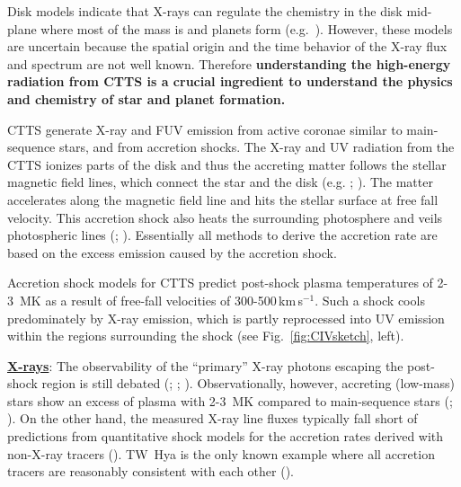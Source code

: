 \documentclass[letterpaper,11pt,twocolumn]{article}
\begin{document}
Disk models indicate that X-rays can regulate the chemistry in the disk mid-plane where most of the mass is and planets form (e.g.\ ). However, these models are uncertain because the spatial origin and the time behavior of the X-ray flux and spectrum are not well known.
Therefore
{\bf understanding the high-energy radiation from CTTS is a crucial ingredient to understand the physics and chemistry of star and planet formation.} 

CTTS generate X-ray and FUV emission from active coronae similar to main-sequence stars, and from accretion shocks.
The X-ray and UV radiation from the CTTS ionizes parts of the disk and thus the accreting matter follows the stellar magnetic field lines, which connect the star and the disk (e.g. ; ). The matter accelerates along the magnetic field line and hits the stellar surface at free fall velocity.
This accretion shock also heats the surrounding photosphere and veils photospheric lines (; ). Essentially all methods to derive 
the accretion rate are based on the excess emission caused by the accretion shock. 

Accretion shock models for CTTS predict post-shock plasma
temperatures of 2-3~MK as a result of free-fall velocities of 
300-500\,km\,s$^{-1}$. Such a shock cools predominately by
X-ray emission, which is partly reprocessed into UV emission within the regions surrounding the shock (see Fig.~\ref{fig:CIVsketch}, left). 

\underline{\bf X-rays}: The observability of the ``primary'' X-ray photons 
escaping the post-shock region is still debated 
(; ; ). Observationally, 
however, accreting (low-mass) stars show  an excess of plasma with 2-3~MK
compared to main-sequence stars (; ).
On the other hand, the measured X-ray line fluxes typically fall short of
predictions from quantitative shock models for the accretion rates derived with non-X-ray tracers (). TW~Hya is the only known example where all accretion tracers are reasonably consistent with each other (). 
\end{document}
